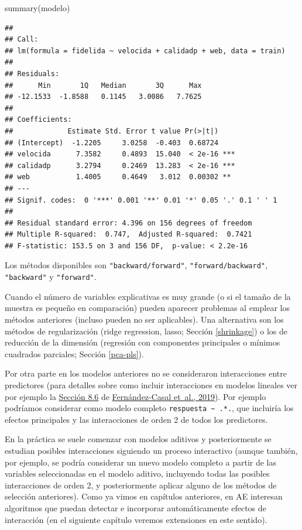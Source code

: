 \documentclass[
  spanish,
]{book}
\newenvironment{Shaded}{\begin{snugshade}}{\end{snugshade}}
\newcommand{\FunctionTok}[1]{\textcolor[rgb]{0.00,0.00,0.00}{#1}}
\newcommand{\NormalTok}[1]{#1}
\theoremstyle{break}
\theoremstyle{definition}
\theoremstyle{definition}
\theoremstyle{definition}
\theoremstyle{definition}
\theoremstyle{remark}
\begin{document}
\begin{Shaded}
\begin{Highlighting}[]
\FunctionTok{summary}\NormalTok{(modelo)}
\end{Highlighting}
\end{Shaded}

\begin{verbatim}
## 
## Call:
## lm(formula = fidelida ~ velocida + calidadp + web, data = train)
## 
## Residuals:
##      Min       1Q   Median       3Q      Max 
## -12.1533  -1.8588   0.1145   3.0086   7.7625 
## 
## Coefficients:
##             Estimate Std. Error t value Pr(>|t|)    
## (Intercept)  -1.2205     3.0258  -0.403  0.68724    
## velocida      7.3582     0.4893  15.040  < 2e-16 ***
## calidadp      3.2794     0.2469  13.283  < 2e-16 ***
## web           1.4005     0.4649   3.012  0.00302 ** 
## ---
## Signif. codes:  0 '***' 0.001 '**' 0.01 '*' 0.05 '.' 0.1 ' ' 1
## 
## Residual standard error: 4.396 on 156 degrees of freedom
## Multiple R-squared:  0.747,  Adjusted R-squared:  0.7421 
## F-statistic: 153.5 on 3 and 156 DF,  p-value: < 2.2e-16
\end{verbatim}

Los métodos disponibles son \texttt{"backward/forward"}, \texttt{"forward/backward"}, \texttt{"backward"} y \texttt{"forward"}.

Cuando el número de variables explicativas es muy grande (o si el tamaño de la muestra es pequeño en comparación) pueden aparecer problemas al emplear los métodos anteriores (incluso pueden no ser aplicables).
Una alternativa son los métodos de regularización (ridge regression, lasso; Sección \ref{shrinkage}) o los de reducción de la dimensión (regresión con componentes principales o mínimos cuadrados parciales; Sección \ref{pca-pls}).

Por otra parte en los modelos anteriores no se consideraron interacciones entre predictores (para detalles sobre como incluir interacciones en modelos lineales ver por ejemplo la \href{https://rubenfcasal.github.io/intror/modelos-lineales.html\#interacciones}{Sección 8.6} de \protect\hyperlink{ref-fernandez2019intror}{Fernández-Casal et~al., 2019}).
Por ejemplo podríamos considerar como modelo completo \texttt{respuesta\ \textasciitilde{}\ .*.}, que incluiría los efectos principales y las interacciones de orden 2 de todos los predictores.

En la práctica se suele comenzar con modelos aditivos y posteriormente se estudian posibles interacciones siguiendo un proceso interactivo (aunque también, por ejemplo, se podría considerar un nuevo modelo completo a partir de las variables seleccionadas en el modelo aditivo, incluyendo todas las posibles interacciones de orden 2, y posteriormente aplicar alguno de los métodos de selección anteriores).
Como ya vimos en capítulos anteriores, en AE interesan algoritmos que puedan detectar e incorporar automáticamente efectos de interacción (en el siguiente capítulo veremos extensiones en este sentido).
\end{document}

